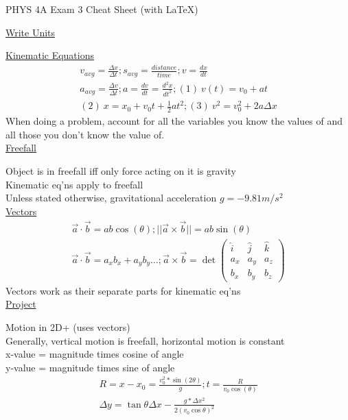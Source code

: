 \documentclass[8pt]{minimal}
\begin{document}
\setlength{\parindent}{0pt}
\setlength{\columnsep}{1cm}
\twocolumn
PHYS 4A Exam 3 Cheat Sheet (with \LaTeX)

\underline{Write Units}

\underline{Kinematic Equations}
\begin{gather*}
    v_{avg}=\frac{\Delta x}{\Delta t}; s_{avg}=\frac{distance}{time};v=\frac{dx}{dt}\\
    a_{avg}=\frac{\Delta v}{\Delta t}; a = \frac{dv}{dt} = \frac{d^2x}{dt^2}; (1)\ v(t) = v_0 + at\\
    (2)\ x = x_0 + v_0t + \frac{1}{2}at^2; (3)\ v^2 = v_0^2 + 2a\Delta x
\end{gather*}
When doing a problem, account for all the variables you know the values of and all those you don't know the value of.\\

\underline{Freefall}

Object is in freefall iff only force acting on it is gravity\\
Kinematic eq'ns apply to freefall\\
Unless stated otherwise, gravitational acceleration $g=-9.81m/s^2$\\

\underline{Vectors}
\begin{gather*}
    \vec{a} \cdot \vec{b} = ab \cos(\theta); || \vec{a}\times \vec{b} || = ab \sin(\theta)\\
    \vec{a} \cdot \vec{b} = a_x b_x+a_y b_y\dots; \vec{a}\times \vec{b} = \det \left( \begin{smallmatrix} \hat{i} & \hat{j} &\hat{k} \\ a_x & a_y & a_z \\ b_x & b_y & b_z  \end{smallmatrix} \right)
\end{gather*}
Vectors work as their separate parts for kinematic eq'ns
\\

\underline{Project}

Motion in 2D+ (uses vectors)\\
Generally, vertical motion is freefall, horizontal motion is constant \\
x-value = magnitude times cosine of angle\\
y-value = magnitude times sine of angle\\
\begin{gather*}
    R=x-x_0=\frac{v_0^2*\sin(2\theta)}{g};t=\frac{R}{v_0  \cos(\theta)}\\
    \Delta y =\tan\theta \Delta x - \frac{g*\Delta x^2}{2(v_0  \cos\theta)^2 }
\end{gather*}
\end{document}
